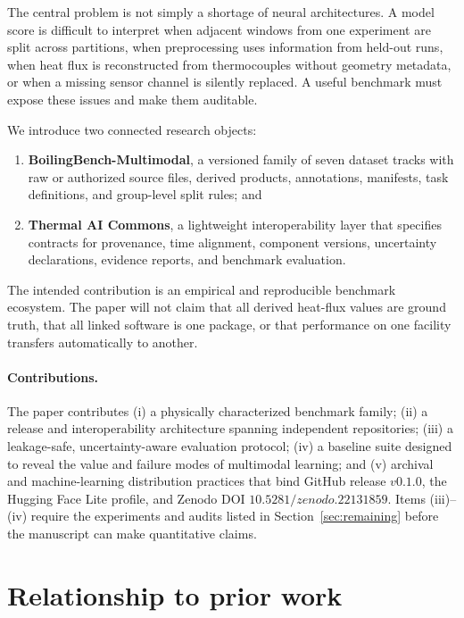 \documentclass[11pt]{article}
\begin{document}
The central problem is not simply a shortage of neural architectures. A model score is difficult to interpret when adjacent windows from one experiment are split across partitions, when preprocessing uses information from held-out runs, when heat flux is reconstructed from thermocouples without geometry metadata, or when a missing sensor channel is silently replaced. A useful benchmark must expose these issues and make them auditable.

We introduce two connected research objects:
\begin{enumerate}
  \item \textbf{BoilingBench-Multimodal}, a versioned family of seven dataset tracks with raw or authorized source files, derived products, annotations, manifests, task definitions, and group-level split rules; and
  \item \textbf{Thermal AI Commons}, a lightweight interoperability layer that specifies contracts for provenance, time alignment, component versions, uncertainty declarations, evidence reports, and benchmark evaluation.
\end{enumerate}

The intended contribution is an empirical and reproducible benchmark ecosystem. The paper will not claim that all derived heat-flux values are ground truth, that all linked software is one package, or that performance on one facility transfers automatically to another.

\paragraph{Contributions.} The paper contributes (i) a physically characterized benchmark family; (ii) a release and interoperability architecture spanning independent repositories; (iii) a leakage-safe, uncertainty-aware evaluation protocol; (iv) a baseline suite designed to reveal the value and failure modes of multimodal learning; and (v) archival and machine-learning distribution practices that bind GitHub release $v0.1.0$, the Hugging Face Lite profile, and Zenodo DOI $10.5281/zenodo.22131859$. Items (iii)--(iv) require the experiments and audits listed in Section~\ref{sec:remaining} before the manuscript can make quantitative claims.

\section{Relationship to prior work}
\label{sec:prior}
\end{document}
